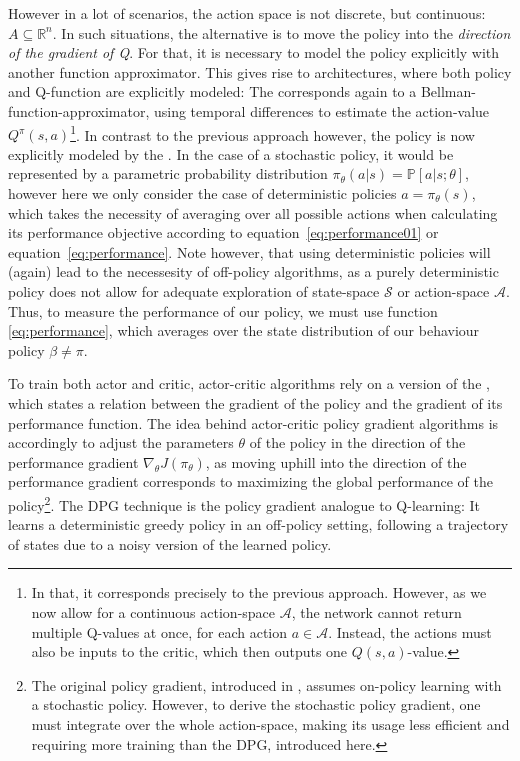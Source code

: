 \noindent However in a lot of scenarios, the action space is not discrete, but continuous: \mbox{$A \subseteq \mathds{R}^n$}. In such situations, the alternative is to move the policy into the \textit{direction of the gradient of Q}. For that, it is necessary to model the policy explicitly with another function approximator. This gives rise to  architectures, where both policy and Q-function are explicitly modeled: The  corresponds again to a Bellman-function-approximator, using temporal differences to estimate the action-value $Q^\pi(s,a)$\footnote{In that, it corresponds precisely to the previous approach. However, as we now allow for a continuous action-space $\mathcal{A}$, the network cannot return multiple Q-values at once, for each action $a \in \mathcal{A}$. Instead, the actions must also be inputs to the critic, which then outputs one $Q(s,a)$-value.}. In contrast to the previous approach however, the policy is now explicitly modeled by the . In the case of a stochastic policy, it would be represented by a parametric probability distribution $\pi_\theta(a|s) = \mathds{P}[a|s;\theta]$, however here we only consider the case of deterministic policies $a = \pi_\theta(s)$, which takes the necessity of averaging over all possible actions when calculating its performance objective according to equation~\ref{eq:performance01} or equation~\ref{eq:performance}. Note however, that using deterministic policies will (again) lead to the necessesity of off-policy algorithms, as a purely deterministic policy does not allow for adequate exploration of state-space $\mathcal{S}$ or action-space $\mathcal{A}$. Thus, to measure the performance of our policy, we must use function \ref{eq:performance}, which averages over the state distribution of our behaviour policy $\beta \neq \pi$. 

To train both actor and critic, actor-critic algorithms rely on a version of the , which states a relation between the gradient of the policy and the gradient of its performance function. The idea behind actor-critic policy gradient algorithms is accordingly to adjust the parameters $\theta$ of the policy in the direction of the performance gradient $\nabla_{\theta}J(\pi_\theta)$, as moving uphill into the direction of the performance gradient corresponds to maximizing the global performance of the policy\footnote{The original policy gradient, introduced in \cite{sutton_policy_2000}, assumes on-policy learning with a stochastic policy. However, to derive the stochastic policy gradient, one must integrate over the whole action-space, making its usage less efficient and requiring more training than the DPG, introduced here.}. The DPG technique is the policy gradient analogue to Q-learning: It learns a deterministic greedy policy in an off-policy setting, following a trajectory of states due to a noisy version of the learned policy.

